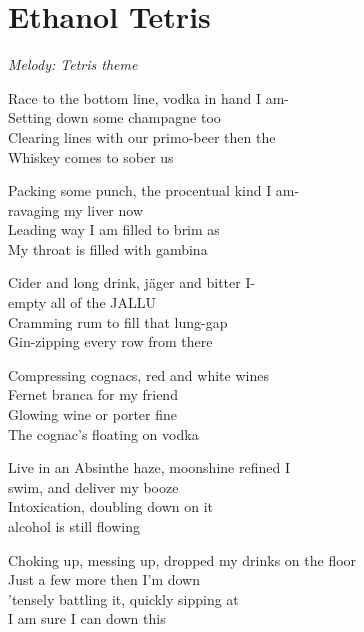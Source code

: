 \section{Ethanol Tetris}

\textit{Melody: Tetris theme}

Race to the bottom line, vodka in hand I am-\\
Setting down some champagne too\\
Clearing lines with our primo-beer then the\\
Whiskey comes to sober us

Packing some punch, the procentual kind I am-\\
ravaging my liver now\\
Leading way I am filled to brim as\\
My throat is filled with gambina

Cider and long drink, jäger and bitter I-\\
empty all of the JALLU\\
Cramming rum to fill that lung-gap\\
Gin-zipping every row from there

Compressing cognacs, red and white wines\\
Fernet branca for my friend\\
Glowing wine or porter fine\\
The cognac's floating on vodka

Live in an Absinthe haze, moonshine refined I\\
swim, and deliver my booze\\
Intoxication, doubling down on it\\
alcohol is still flowing

Choking up, messing up, dropped my drinks on the floor\\
Just a few more then I'm down\\
'tensely battling it, quickly sipping at\\
I am sure I can down this\\
